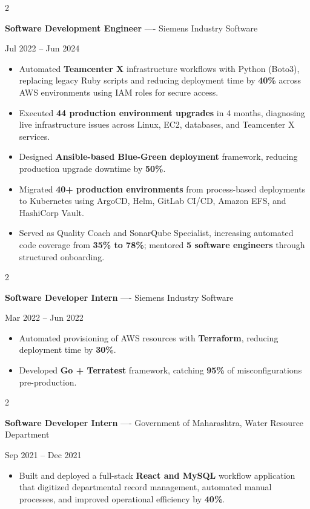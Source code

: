 \documentclass[10pt, letterpaper]{article}
\newenvironment{highlights}{
    \begin{itemize}[
        topsep=0.10 cm,
        parsep=0.06 cm,
        partopsep=0pt,
        itemsep=0.06 cm,
        leftmargin=12pt
    ]
}{
    \end{itemize}
}
\newenvironment{twocolentry}[2][]{
    \onecolentry
    \def\secondColumn{#2}
    \setcolumnwidth{\fill, 4.5 cm}
    \begin{paracol}{2}
}{
    \switchcolumn \raggedleft \secondColumn
    \end{paracol}
    \endonecolentry
}
\begin{document}
\vspace{0.15 cm}

\begin{twocolentry}{Jul 2022 -- Jun 2024}
\textbf{Software Development Engineer} ---- Siemens Industry Software
\end{twocolentry}
\begin{highlights}
  \item Automated \textbf{Teamcenter X} infrastructure workflows with Python (Boto3), replacing legacy Ruby scripts and reducing deployment time by \textbf{40\%} across AWS environments using IAM roles for secure access.
  \item Executed \textbf{44 production environment upgrades} in 4 months, diagnosing live infrastructure issues across Linux, EC2, databases, and Teamcenter X services.
  \item Designed \textbf{Ansible-based Blue-Green deployment} framework, reducing production upgrade downtime by \textbf{50\%}.
  \item Migrated \textbf{40+ production environments} from process-based deployments to Kubernetes using ArgoCD, Helm, GitLab CI/CD, Amazon EFS, and HashiCorp Vault.
  \item Served as Quality Coach and SonarQube Specialist, increasing automated code coverage from \textbf{35\% to 78\%}; mentored \textbf{5 software engineers} through structured onboarding.
\end{highlights}

\vspace{0.15 cm}

\begin{twocolentry}{Mar 2022 -- Jun 2022}
\textbf{Software Developer Intern} ---- Siemens Industry Software
\end{twocolentry}
\begin{highlights}
  \item Automated provisioning of AWS resources with \textbf{Terraform}, reducing deployment time by \textbf{30\%}.
  \item Developed \textbf{Go + Terratest} framework, catching \textbf{95\%} of misconfigurations pre-production.
\end{highlights}

\vspace{0.15 cm}

\begin{twocolentry}{Sep 2021 -- Dec 2021}
\textbf{Software Developer Intern} ---- Government of Maharashtra, Water Resource Department
\end{twocolentry}
\begin{highlights}
  \item Built and deployed a full-stack \textbf{React and MySQL} workflow application that digitized departmental record management, automated manual processes, and improved operational efficiency by \textbf{40\%}.
\end{highlights}
\end{document}

